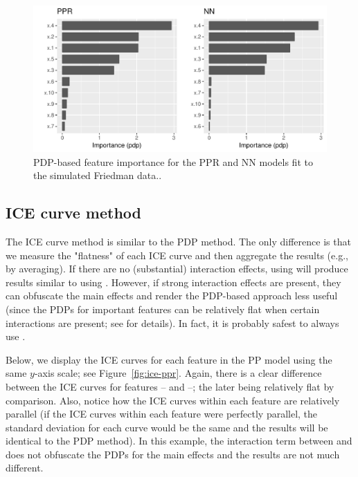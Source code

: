 \begin{figure}[!htb]
  \centering 
  \includegraphics[width=1\linewidth]{figures/vip-ppr-nn} 
  \caption{PDP-based feature importance for the PPR and NN models fit to the simulated Friedman data..}
  \label{fig:pdp-ppr-nn}
\end{figure}

\subsection{ICE curve method}

The ICE curve method is similar to the PDP method. The only difference is that we measure the "flatness" of each ICE curve and then aggregate the results (e.g., by averaging). If there are no (substantial) interaction effects, using  will produce results similar to using . However, if strong interaction effects are present, they can obfuscate the main effects and render the PDP-based approach less useful (since the PDPs for important features can be relatively flat when certain interactions are present; see \citet{goldstein-peeking-2015} for details). In fact, it is probably safest to always use .

Below, we display the ICE curves for each feature in the PP model using the same $y$-axis scale; see Figure~\ref{fig:ice-ppr}. Again, there is a clear difference between the ICE curves for features -- and --; the later being relatively flat by comparison. Also, notice how the ICE curves within each feature are relatively parallel (if the ICE curves within each feature were perfectly parallel, the standard deviation for each curve would be the same and the results will be identical to the PDP method). In this example, the interaction term between  and  does not obfuscate the PDPs for the main effects and the results are not much different.

